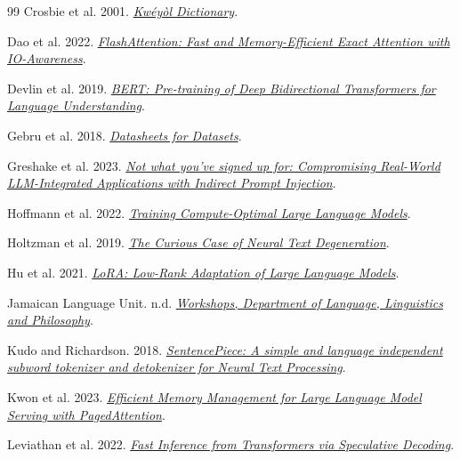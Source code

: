 \begin{thebibliography}{99}
Crosbie et al. 2001. \href{https://saintluciancreole.dbfrank.net/dictionary/KweyolDictionary.pdf}{\emph{Kwéyòl Dictionary}}.

Dao et al. 2022. \href{https://arxiv.org/abs/2205.14135}{\emph{FlashAttention: Fast and Memory-Efficient Exact Attention with IO-Awareness}}.

Devlin et al. 2019. \href{https://aclanthology.org/N19-1423/}{\emph{BERT: Pre-training of Deep Bidirectional Transformers for Language Understanding}}.

Gebru et al. 2018. \href{https://arxiv.org/abs/1803.09010}{\emph{Datasheets for Datasets}}.

Greshake et al. 2023. \href{https://arxiv.org/abs/2302.12173}{\emph{Not what you've signed up for: Compromising Real-World LLM-Integrated Applications with Indirect Prompt Injection}}.

Hoffmann et al. 2022. \href{https://arxiv.org/abs/2203.15556}{\emph{Training Compute-Optimal Large Language Models}}.

Holtzman et al. 2019. \href{https://arxiv.org/abs/1904.09751}{\emph{The Curious Case of Neural Text Degeneration}}.

Hu et al. 2021. \href{https://arxiv.org/abs/2106.09685}{\emph{LoRA: Low-Rank Adaptation of Large Language Models}}.

Jamaican Language Unit. n.d. \href{https://www.mona.uwi.edu/dllp/postgrad/jlu/workshops}{\emph{Workshops, Department of Language, Linguistics and Philosophy}}.

Kudo and Richardson. 2018. \href{https://aclanthology.org/D18-2012/}{\emph{SentencePiece: A simple and language independent subword tokenizer and detokenizer for Neural Text Processing}}.

Kwon et al. 2023. \href{https://arxiv.org/abs/2309.06180}{\emph{Efficient Memory Management for Large Language Model Serving with PagedAttention}}.

Leviathan et al. 2022. \href{https://arxiv.org/abs/2211.17192}{\emph{Fast Inference from Transformers via Speculative Decoding}}.


\end{thebibliography}

